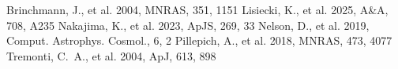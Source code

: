 \documentclass[twocolumn]{aastex631}
\begin{document}
\begin{thebibliography}{}
 Brinchmann, J., et al. 2004, MNRAS, 351, 1151
 Lisiecki, K., et al. 2025, A\&A, 708, A235
 Nakajima, K., et al. 2023, ApJS, 269, 33
 Nelson, D., et al. 2019, Comput. Astrophys. Cosmol., 6, 2
 Pillepich, A., et al. 2018, MNRAS, 473, 4077
 Tremonti, C.~A., et al. 2004, ApJ, 613, 898
\end{thebibliography}
\end{document}
